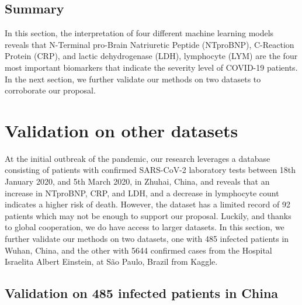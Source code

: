 
\color{black}

\subsection{Summary}

In this section, the interpretation of four different machine learning models reveals that N-Terminal pro-Brain Natriuretic Peptide (NTproBNP), C-Reaction Protein (CRP), and lactic dehydrogenase (LDH), lymphocyte (LYM) are the four most important biomarkers that indicate the severity level of COVID-19 patients. In the next section, we further validate our methods on two datasets to corroborate our proposal.


\section{Validation on other datasets}

At the initial outbreak of the pandemic, our research leverages a database consisting of patients with confirmed SARS-CoV-2 laboratory tests between 18th January 2020, and 5th March 2020, in Zhuhai, China, and reveals that an increase in NTproBNP, CRP, and LDH, and a decrease in lymphocyte count indicates a higher risk of death. However, the dataset has a limited record of 92 patients which may not be enough to support our proposal. Luckily, and thanks to global cooperation, we do have access to larger datasets. In this section, we further validate our methods on two datasets, one with 485 infected patients in Wuhan, China\citep{Yan2020}, and the other with 5644 confirmed cases from the Hospital Israelita Albert Einstein, at São Paulo, Brazil from Kaggle.

\subsection{Validation on 485 infected patients in China}

